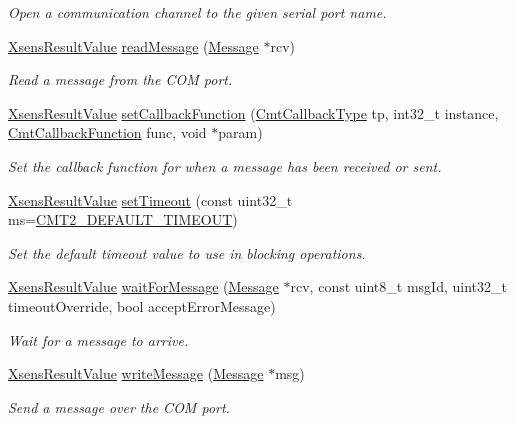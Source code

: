 \begin{DoxyCompactItemize}
\begin{DoxyCompactList}\small\item\em \-Open a communication channel to the given serial port name. \end{DoxyCompactList}\item 
\hyperlink{group__enums_ga822a2260a20af524029eef9e9a51ff6f}{\-Xsens\-Result\-Value} \hyperlink{classxsens_1_1Cmt2s_a8de6b3c4801b79c16c4ac73b86eb97b3}{read\-Message} (\hyperlink{classxsens_1_1Message}{\-Message} $\ast$rcv)
\begin{DoxyCompactList}\small\item\em \-Read a message from the \-C\-O\-M port. \end{DoxyCompactList}\item 
\hypertarget{classxsens_1_1Cmt2s_ac711824f5e4a5ac2a2099bae1db3502c}{\hyperlink{group__enums_ga822a2260a20af524029eef9e9a51ff6f}{\-Xsens\-Result\-Value} \hyperlink{classxsens_1_1Cmt2s_ac711824f5e4a5ac2a2099bae1db3502c}{set\-Callback\-Function} (\hyperlink{cmtdef_8h_a3944c5bada7f23f30534019faf605174}{\-Cmt\-Callback\-Type} tp, int32\-\_\-t instance, \hyperlink{cmtdef_8h_a83bf10c11731ef4cd254260e7e4d13c7}{\-Cmt\-Callback\-Function} func, void $\ast$param)}\label{classxsens_1_1Cmt2s_ac711824f5e4a5ac2a2099bae1db3502c}

\begin{DoxyCompactList}\small\item\em \-Set the callback function for when a message has been received or sent. \end{DoxyCompactList}\item 
\hyperlink{group__enums_ga822a2260a20af524029eef9e9a51ff6f}{\-Xsens\-Result\-Value} \hyperlink{classxsens_1_1Cmt2s_a80c5349c0813dc5c21b28662a72e714c}{set\-Timeout} (const uint32\-\_\-t ms=\hyperlink{cmtdef_8h_aab875c2b217956722317f1ebbde6c920}{\-C\-M\-T2\-\_\-\-D\-E\-F\-A\-U\-L\-T\-\_\-\-T\-I\-M\-E\-O\-U\-T})
\begin{DoxyCompactList}\small\item\em \-Set the default timeout value to use in blocking operations. \end{DoxyCompactList}\item 
\hyperlink{group__enums_ga822a2260a20af524029eef9e9a51ff6f}{\-Xsens\-Result\-Value} \hyperlink{classxsens_1_1Cmt2s_ad2678d6836924313a6db0b861818536c}{wait\-For\-Message} (\hyperlink{classxsens_1_1Message}{\-Message} $\ast$rcv, const uint8\-\_\-t msg\-Id, uint32\-\_\-t timeout\-Override, bool accept\-Error\-Message)
\begin{DoxyCompactList}\small\item\em \-Wait for a message to arrive. \end{DoxyCompactList}\item 
\hyperlink{group__enums_ga822a2260a20af524029eef9e9a51ff6f}{\-Xsens\-Result\-Value} \hyperlink{classxsens_1_1Cmt2s_a0cd65c8ae8f214e65cdca6c8aceb262c}{write\-Message} (\hyperlink{classxsens_1_1Message}{\-Message} $\ast$msg)
\begin{DoxyCompactList}\small\item\em \-Send a message over the \-C\-O\-M port. \end{DoxyCompactList}\end{DoxyCompactItemize}
